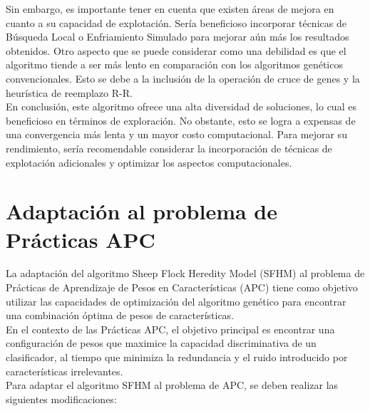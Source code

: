 Sin embargo, es importante tener en cuenta que existen áreas de mejora en cuanto a su capacidad de explotación. Sería beneficioso incorporar técnicas de Búsqueda Local o Enfriamiento Simulado para mejorar aún más los resultados obtenidos. Otro aspecto que se puede considerar como una debilidad es que el algoritmo tiende a ser más lento en comparación con los algoritmos genéticos convencionales. Esto se debe a la inclusión de la operación de cruce de genes y la heurística de reemplazo R-R.\\

En conclusión, este algoritmo ofrece una alta diversidad de soluciones, lo cual es beneficioso en términos de exploración. No obstante, esto se logra a expensas de una convergencia más lenta y un mayor costo computacional. Para mejorar su rendimiento, sería recomendable considerar la incorporación de técnicas de explotación adicionales y optimizar los aspectos computacionales.

\section{Adaptación al problema de Prácticas APC}
La adaptación del algoritmo Sheep Flock Heredity Model (SFHM) al problema de Prácticas de Aprendizaje de Pesos en Características (APC) tiene como objetivo utilizar las capacidades de optimización del algoritmo genético para encontrar una combinación óptima de pesos de características.\\

En el contexto de las Prácticas APC, el objetivo principal es encontrar una configuración de pesos que maximice la capacidad discriminativa de un clasificador, al tiempo que minimiza la redundancia y el ruido introducido por características irrelevantes.\\

Para adaptar el algoritmo SFHM al problema de APC, se deben realizar las siguientes modificaciones:


